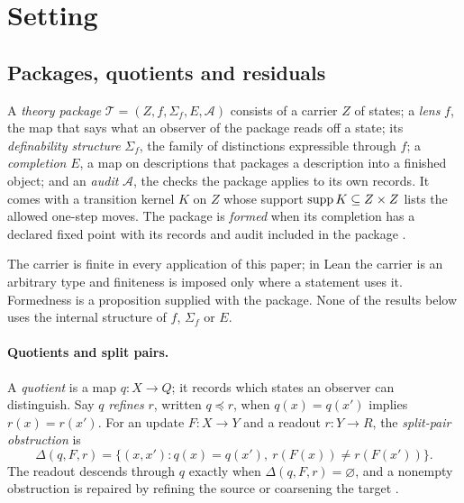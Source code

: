 \section{Setting}\label{sec:setting}

\subsection{Packages, quotients and residuals}\label{sec:setting-apparatus}

\begin{definition}\label{def:theory-package}
A \emph{theory package} $\mathcal T = (Z, f, \Sigma_f, E, \mathcal A)$ consists of a carrier $Z$ of
states; a \emph{lens} $f$, the map that says what an observer of the package reads off a state; its
\emph{definability structure} $\Sigma_f$, the family of distinctions expressible through $f$; a
\emph{completion} $E$, a map on descriptions that packages a description into a finished object; and
an \emph{audit} $\mathcal A$, the checks the package applies to its own records. It comes with a
transition kernel $K$ on $Z$ whose support $\operatorname{supp} K \subseteq Z \times Z$ lists the allowed one-step
moves. The package is \emph{formed} when its completion has a declared fixed point with its records
and audit included in the package \citep{Tsiokos2026FoundI}.
\end{definition}

The carrier is finite in every application of this paper; in Lean the carrier is an arbitrary type
and finiteness is imposed only where a statement uses it. Formedness is a proposition supplied with
the package. None of the results below uses the internal structure of $f$, $\Sigma_f$ or $E$.

\paragraph{Quotients and split pairs.} A \emph{quotient} is a map $q : X \to Q$; it records which
states an observer can distinguish. Say $q$ \emph{refines} $r$, written $q \preceq r$, when
$q(x) = q(x')$ implies $r(x) = r(x')$. For an update $F : X \to Y$ and a readout $r : Y \to R$, the
\emph{split-pair obstruction} is
\begin{equation}\label{eq:split}
  \Delta(q, F, r) = \{(x, x') : q(x) = q(x'),\ r(F(x)) \ne r(F(x'))\}.
\end{equation}
The readout descends through $q$ exactly when $\Delta(q,F,r) = \varnothing$, and a nonempty
obstruction is repaired by refining the source or coarsening the target \citep{Tsiokos2026FoundIV}.

